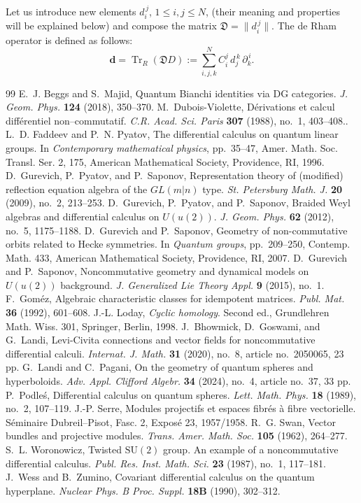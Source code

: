 \documentclass[10pt,a4paper]{amsart}
\newcommand{\pa}{\partial}
\DeclareMathOperator{\Tr}{Tr}
\newcommand{\DDDD}{\mathfrak{D}}
\newcommand{\dd}{\mathbf{d}}
\numberwithin{equation}{section}
\begin{document}
Let us introduce new elements $d_i^{\,j}$, $1\leq i,j \leq N$, (their meaning and properties will be explained below) and compose
 the matrix $\DDDD=\|d_i^{\,j}\|$. The de Rham operator is defined as follows:
\begin{equation}
\dd=\Tr_R(\DDDD D):=\sum_{i,j,k}^N C_i^j \, d_j^{\,k}\, \pa_k^{\,i}.
\label{ddR}
\end{equation}

\begin{thebibliography}{99}
 E.~J. Beggs and S.~Majid, Quantum Bianchi identities via DG categories. \emph{J. Geom. Phys.} \textbf{124} (2018), 350--370.
 M.~Dubois-Violette, D\'erivations et calcul diff\'erentiel non–commutatif. \emph{C.R. Acad. Sci. Paris } \textbf{307} (1988), no.~1, 403–408..
 L.~D. Faddeev and P.~N. Pyatov, The differential calculus on quantum linear groups. In \emph{Contemporary mathematical physics}, pp.~35--47, Amer. Math. Soc. Transl. Ser. 2, 175, American Mathematical Society, Providence, RI, 1996.
 D.~Gurevich, P.~Pyatov, and P.~Saponov, Representation theory of (modified) reflection equation algebra of the $GL(m|n)$ type. \emph{St. Petersburg Math. J.} \textbf{20} (2009), no.~2, 213--253.
 D.~Gurevich, P.~Pyatov, and P.~Saponov, Braided Weyl algebras and differential calculus on $U(u(2))$. \emph{J. Geom. Phys.} \textbf{62} (2012), no.~5, 1175--1188.
 D.~Gurevich and P.~Saponov, Geometry of non-commutative orbits related to Hecke symmetries. In \emph{Quantum groups}, pp.~209--250, Contemp. Math. 433, American Mathematical Society, Providence, RI, 2007.
 D.~Gurevich and P.~Saponov, Noncommutative geometry and dynamical models on $U(u(2))$ background. \emph{J. Generalized Lie Theory Appl.} \textbf{9} (2015), no.~1.
 F.~Gom\'ez, Algebraic characteristic classes for idempotent matrices. \emph{Publ. Mat.} \textbf{36} (1992), 601--608.
 J.-L. Loday, \emph{Cyclic homology}. Second ed., Grundlehren Math. Wiss. 301, Springer, Berlin, 1998.
 J.~Bhowmick, D.~Goswami, and G.~Landi, Levi-Civita connections and vector fields for noncommutative differential calculi. \emph{Internat. J. Math.} \textbf{31} (2020), no.~8, article no.~2050065, 23 pp.
 G.~Landi and C.~Pagani, On the geometry of quantum spheres and hyperboloids. \emph{Adv. Appl. Clifford Algebr.} \textbf{34} (2024), no.~4, article no.~37, 33 pp.
 P.~Podle\'s, Differential calculus on quantum spheres. \emph{Lett. Math. Phys.} \textbf{18} (1989), no.~2, 107--119.
 J.-P. Serre, Modules projectifs et espaces fibr\'es \`a fibre vectorielle. S\'eminaire Dubreil--Pisot, Fasc. 2, Expos\'e 23, 1957/1958.
 R.~G. Swan, Vector bundles and projective modules. \emph{Trans. Amer. Math. Soc.} \textbf{105} (1962), 264--277.
 S.~L. Woronowicz, Twisted $\mathrm{SU}(2)$ group. An example of a noncommutative differential calculus. \emph{Publ. Res. Inst. Math. Sci.} \textbf{23} (1987), no.~1, 117--181.
 J.~Wess and B.~Zumino, Covariant differential calculus on the quantum hyperplane. \emph{Nuclear Phys. B Proc. Suppl.} \textbf{18B} (1990), 302--312.
\end{thebibliography}
\end{document}
